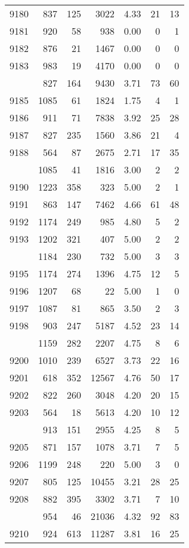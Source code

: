 \documentclass[
]{article}
\begin{document}
\begin{table}
\begin{tabular}[t]{lrrrrrr}
9180 & 837 & 125 & 3022 & 4.33 & 21 & 13\\
9181 & 920 & 58 & 938 & 0.00 & 0 & 1\\
9182 & 876 & 21 & 1467 & 0.00 & 0 & 0\\
9183 & 983 & 19 & 4170 & 0.00 & 0 & 0\\
\addlinespace
9184 & 827 & 164 & 9430 & 3.71 & 73 & 60\\
9185 & 1085 & 61 & 1824 & 1.75 & 4 & 1\\
9186 & 911 & 71 & 7838 & 3.92 & 25 & 28\\
9187 & 827 & 235 & 1560 & 3.86 & 21 & 4\\
9188 & 564 & 87 & 2675 & 2.71 & 17 & 35\\
\addlinespace
9189 & 1085 & 41 & 1816 & 3.00 & 2 & 2\\
9190 & 1223 & 358 & 323 & 5.00 & 2 & 1\\
9191 & 863 & 147 & 7462 & 4.66 & 61 & 48\\
9192 & 1174 & 249 & 985 & 4.80 & 5 & 2\\
9193 & 1202 & 321 & 407 & 5.00 & 2 & 2\\
\addlinespace
9194 & 1184 & 230 & 732 & 5.00 & 3 & 3\\
9195 & 1174 & 274 & 1396 & 4.75 & 12 & 5\\
9196 & 1207 & 68 & 22 & 5.00 & 1 & 0\\
9197 & 1087 & 81 & 865 & 3.50 & 2 & 3\\
9198 & 903 & 247 & 5187 & 4.52 & 23 & 14\\
\addlinespace
9199 & 1159 & 282 & 2207 & 4.75 & 8 & 6\\
9200 & 1010 & 239 & 6527 & 3.73 & 22 & 16\\
9201 & 618 & 352 & 12567 & 4.76 & 50 & 17\\
9202 & 822 & 260 & 3048 & 4.20 & 20 & 15\\
9203 & 564 & 18 & 5613 & 4.20 & 10 & 12\\
\addlinespace
9204 & 913 & 151 & 2955 & 4.25 & 8 & 5\\
9205 & 871 & 157 & 1078 & 3.71 & 7 & 5\\
9206 & 1199 & 248 & 220 & 5.00 & 3 & 0\\
9207 & 805 & 125 & 10455 & 3.21 & 28 & 25\\
9208 & 882 & 395 & 3302 & 3.71 & 7 & 10\\
\addlinespace
9209 & 954 & 46 & 21036 & 4.32 & 92 & 83\\
9210 & 924 & 613 & 11287 & 3.81 & 16 & 25\\

\end{tabular}
\end{table}
\end{document}
